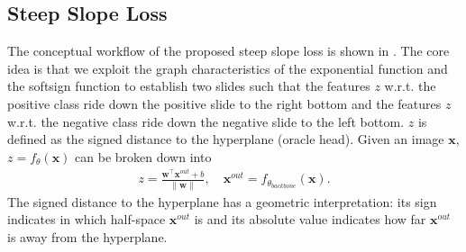 \subsection{Steep Slope Loss}
\label{sec:ss}
The conceptual workflow of the proposed steep slope loss is shown in .
The core idea is that we exploit the graph characteristics of the exponential function and the softsign function to establish two slides such that the features $z$ w.r.t. the positive class ride down the positive slide to the right bottom and the features $z$ w.r.t. the negative class ride down the negative slide to the left bottom.
$z$ is defined as the signed distance to the hyperplane (\ie oracle head). Given an image $\bm{x}$, $z=f_{\theta}(\bm{x})$ can be broken down into
\begin{align}
    z = \frac{\bm{w}^{\top} \bm{x}^{out}+b}{\|\bm{w}\|}, \quad \bm{x}^{out}=f_{\theta_{backbone}}(\bm{x}).
\end{align}
The signed distance to the hyperplane has a geometric interpretation: its sign indicates in which half-space $\bm{x}^{out}$ is and its absolute value indicates how far $\bm{x}^{out}$ is away from the hyperplane.



